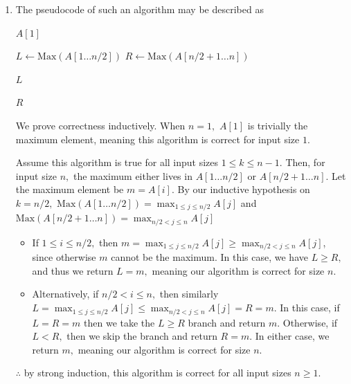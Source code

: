 \documentclass[12pt]{article}
\begin{document}
\begin{enumerate}
  \item The pseudocode of such an algorithm may be described as
    \begin{algorithm}
      \caption{D\&C Max}
      \begin{algorithmic}
        \State \Return $A[1]$
        \EndIf

        \State $L \gets \text{Max}(A[1\ldots n/2])$
        \State $R \gets \text{Max}(A[n/2 + 1 \ldots n])$

        \State \Return $L$
        \EndIf

        \State \Return $R$
        \EndProcedure
      \end{algorithmic}
    \end{algorithm}

    We prove correctness inductively. When $n = 1,$ $A[1]$ is
    trivially the maximum element, meaning this algorithm is correct
    for input size $1.$

    Assume this algorithm is true for all input sizes $1 \leq k \leq
    n - 1.$ Then, for input size $n,$ the maximum either lives in
    $A[1\ldots n/2]$ or $A[n/2 + 1 \ldots n].$ Let the maximum
    element be $m = A[i].$ By our inductive hypothesis on $k = n/2,$
    $\text{Max}(A[1\ldots n/2]) = \max_{1 \leq j \leq n/2} A[j]$ and
    $\text{Max}(A[n/2+1\ldots n]) = \max_{n/2 < j \leq n} A[j]$
    \begin{itemize}
      \item If $1 \leq i \leq n/2,$ then $m = \max_{1 \leq j \leq
        n/2}A[j] \geq \max_{n/2 <j \leq n}A[j]$, since otherwise $m$
        cannot be the maximum. In this case, we have $L \geq R,$ and
        thus we return $L = m,$ meaning our algorithm is correct for size $n.$

      \item Alternatively, if $n/2 < i \leq n,$ then similarly $L =
        \max_{1 \leq j \leq n/2}A[j] \leq \max_{n/2 <j \leq n}A[j] =
        R = m.$ In this case, if $L = R = m$ then we take the $L \geq
        R$ branch and return $m.$ Otherwise, if $L < R,$ then we skip
        the branch and return $R = m.$ In either case, we return $m,$
        meaning our algorithm is correct for size $n$.
    \end{itemize}

    $\therefore$ by strong induction, this algorithm is correct for
    all input sizes $n \geq 1.$


\end{enumerate}
\end{document}
